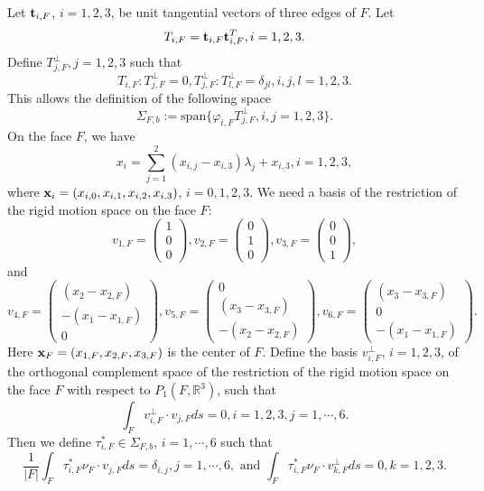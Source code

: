 \documentclass{amsart}
\def\p#1{\begin{pmatrix}#1\end{pmatrix}} \def\c{\operatorname{curl}}
\numberwithin{table}{section}
\numberwithin{figure}{section}
\begin{document}
 Let $\mathbf{t}_{i, F}$, $i=1, 2, 3$,  be unit tangential vectors of three edges of $F$. Let
 \begin{equation}
 T_{i, F}=\mathbf{t}_{i, F}\mathbf{t}_{i, F}^T, i=1, 2, 3.
 \end{equation}
 Define $T^\perp_{j, F}, j=1, 2, 3$  such that
 \begin{equation}
 T_{i,F}:T_{j, F}^\perp=0,  T^\perp_{j, F}:T^\perp_{l, F}=\delta_{jl},  i, j, l=1, 2, 3.
 \end{equation}
 This allows the definition of the following space
 \begin{equation}
\Sigma_{F, b}:=\text{span}\{\varphi_{i, F}T_{j, F}^\perp, i, j=1, 2, 3\}.
 \end{equation}
 On the face $F$, we have
 \begin{equation}
  x_i=\sum\limits_{j=1}^2(x_{i,j}-x_{i,3})\lambda_j+x_{i,3}, i=1,2,3,
 \end{equation}
 where $\mathbf{x}_i=(x_{i,0}, x_{i,1}, x_{i,2}, x_{i,3})$, $i=0, 1, 2, 3$.  We need a basis of the restriction
 of the rigid motion space on the face $F$:
 \begin{equation}
 v_{1,F}=\p{1\\0 \\0}, v_{2,F}=\p{0\\1 \\0}, v_{3,F}=\p{0\\0 \\1},
 \end{equation}
and
\begin{equation}
 v_{4,F}=\p{(x_2-x_{2,F})\\-(x_1-x_{1,F}) \\0}, v_{5,F}=\p{0\\(x_3-x_{3,F}) \\-(x_2-x_{2,F})},
 v_{6,F}=\p{(x_3-x_{3,F})\\0 \\-(x_1-x_{1,F})}.
 \end{equation}
 Here $\mathbf{x}_F=(x_{1, F}, x_{2, F}, x_{3, F})$ is the center of $F$. Define the basis $v_{i,F}^\perp$, $i=1, 2, 3$,  of the orthogonal complement space of the restriction  of the rigid motion space on the face $F$ with respect to $P_1(F, \mathbb{R}^3)$, such that
 \begin{equation}
 \int_F v_{i,F}^\perp\cdot v_{j, F}ds=0, i=1,2,3, j=1,\cdots, 6.
 \end{equation}
Then we define $\tau_{i, F}^\ast\in\Sigma_{F, b}$, $i=1, \cdots, 6$ such that
\begin{equation}
\frac{1}{|F|}\int_F \tau_{i, F}^\ast\nu_F\cdot v_{j,F}ds=\delta_{i,j}, j=1, \cdots, 6,
\text{ and }\int_F\tau_{i, F}^\ast\nu_F\cdot v_{k,F}^\perp ds=0, k=1,2,3.
\end{equation}
\end{document}
